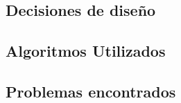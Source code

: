 \subsection{Decisiones de diseño}

\subsection{Algoritmos Utilizados}

\subsection{Problemas encontrados}
